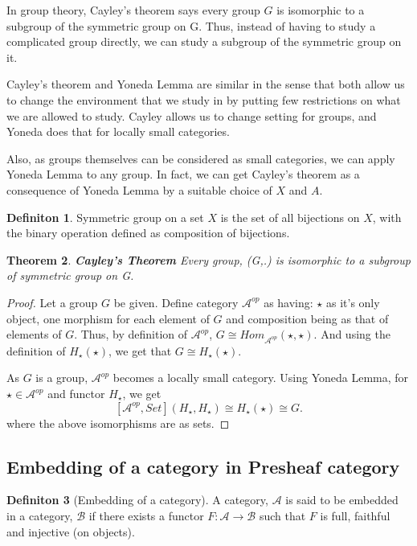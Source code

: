 \documentclass[18pt,a4paper]{article}
\newtheorem{theorem}{Theorem}[section]
\theoremstyle{definition}
\newtheorem{definition}[theorem]{Definiton}
\begin{document}
In group theory, Cayley's theorem says every group $G$ is isomorphic to a subgroup of the symmetric
group on G. Thus, instead of having to study a complicated group directly, we can study a subgroup of
the symmetric group on it.

Cayley's theorem and Yoneda Lemma are similar in the sense that both allow us to change the environment
that we study in by putting few restrictions on what we are allowed to study. Cayley allows us to
change setting for groups, and Yoneda does that for locally small categories.

Also, as groups themselves can be considered as small categories, we can apply Yoneda Lemma to any
group. In fact, we can get Cayley's theorem as a consequence of Yoneda Lemma by a suitable
choice of $X$ and $A$.
\begin{definition} %
	Symmetric group on a set $X$ is the set of all bijections on $X$, with the binary operation
	defined as composition of bijections.
\end{definition}
\begin{theorem}{\textbf{Cayley's Theorem}} %
	Every group, (G,.) is isomorphic to a subgroup of symmetric group on G.
\end{theorem}
\begin{proof} Let a group $G$ be given.
	Define category $\mathcal{A} ^{op}$ as having: $\star$ as it's only object, one
	morphism for each element of $G$ and composition being as that of elements of $G$.
	Thus, by definition of $\mathcal{A} ^{op}$, $G\cong Hom_{\mathcal{A}^{op} }^{}(\star, \star).$
	And using the definition of $H_\star(\star)$, we get that $G \cong H_\star(\star)$.

	As $G$ is a group, $\mathcal{A}^{op}$ becomes a locally small category. Using Yoneda Lemma,
	for $\star \in \mathcal{A} ^{op}$ and functor $H_\star$, we get
	\[ [ \mathcal{A} ^{op}, Set](H_\star,H_\star) \cong H_\star(\star) \cong G .\]
	where the above isomorphisms are as sets.
\end{proof}
\newpage

\subsection{Embedding of a category in Presheaf category}%

\begin{definition}[Embedding of a category] %
	A category, $\mathcal{A}$  is said to be embedded in a category, $\mathcal{B}$ if there exists a
	functor $F: \mathcal{A} \to \mathcal{B} $ such that $F$ is full, faithful and injective (on objects).
\end{definition} %
\end{document}
